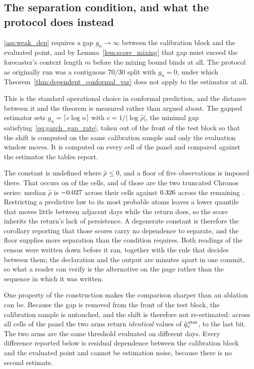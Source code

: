 \subsection{The separation condition, and what the protocol does instead}
\label{sec:theory_gap}

\ref{ass:weak_dep} requires a gap $g_n\to\infty$ between the calibration block
and the evaluated point, and by Lemma~\ref{lem:score_mixing} that gap must exceed
the forecaster's context length $m$ before the mixing bound binds at all. The
protocol as originally run was a contiguous $70/30$ split with $g_n = 0$, under
which Theorem~\ref{thm:dependent_conformal_var} does not apply to the estimator
at all.

This is the standard operational choice in conformal prediction, and the
distance between it and the theorem is measured rather than argued about. The
gapped estimator sets $g_n = \lceil c\log n\rceil$ with
$c = 1/\lvert\log\hat\rho\rvert$, the minimal gap
satisfying~\eqref{eq:garch_gap_rate}, taken out of the front of the test block so
that the shift is computed on the same calibration sample and only the evaluation
window moves. It is computed on every cell of the panel and compared against the
estimator the tables report.

The constant is undefined where $\hat\rho \le 0$, and a floor of five
observations is imposed there. That occurs on \nRhoFallback{} of the
\nRhoCells{} cells, and \nRhoFallbackTrunc{} of those are the two truncated
Chronos series: median $\hat\rho$ is $-0.027$ across their
\nRhoTruncCells{} cells against $0.326$ across the remaining
\nRhoOtherCells. Restricting a predictive law to its most probable atoms leaves
a lower quantile that moves little between adjacent days while the return does,
so the score inherits the return's lack of persistence. A degenerate constant is
therefore the corollary reporting that those scores carry no dependence to
separate, and the floor supplies more separation than the condition requires.
Both readings of the census were written down before it ran, together with the
rule that decides between them; the declaration and the output are minutes apart
in one commit, so what a reader can verify is the alternative on the page rather
than the sequence in which it was written.

One property of the construction makes the comparison sharper than an ablation
can be. Because the gap is removed from the front of the test block, the
calibration sample is untouched, and the shift is therefore not re-estimated:
across all \nGapAllCells{} cells of the panel the two arms return
\emph{identical} values of $\hat{q}_{\scriptscriptstyle\mathrm{V}}^{\,\mathrm{stat}}$, to the last bit. The two arms are the same
threshold evaluated on different days. Every difference reported below is
residual dependence between the calibration block and the evaluated point and
cannot be estimation noise, because there is no second estimate.

